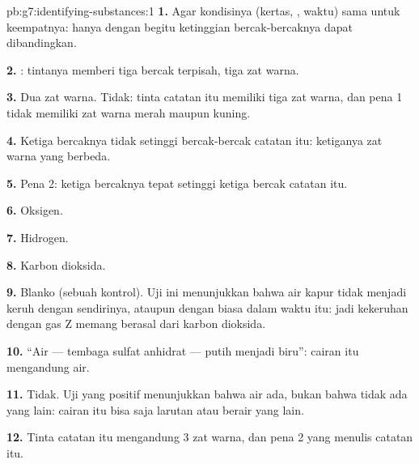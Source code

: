 \begin{solution}{pb:g7:identifying-substances:1}
\textbf{1.} Agar kondisinya (kertas, , waktu) sama untuk
keempatnya: hanya dengan begitu ketinggian bercak-bercaknya dapat
dibandingkan.

\textbf{2.} : tintanya memberi tiga bercak terpisah, tiga zat
warna.

\textbf{3.} Dua zat warna. Tidak: tinta catatan itu memiliki tiga zat
warna, dan pena 1 tidak memiliki zat warna merah maupun kuning.

\textbf{4.} Ketiga bercaknya tidak setinggi bercak-bercak catatan itu:
ketiganya zat warna yang berbeda.

\textbf{5.} Pena 2: ketiga bercaknya tepat setinggi ketiga bercak
catatan itu.

\textbf{6.} Oksigen.

\textbf{7.} Hidrogen.

\textbf{8.} Karbon dioksida.

\textbf{9.} Blanko (sebuah kontrol). Uji ini menunjukkan bahwa air kapur
tidak menjadi keruh dengan sendirinya, ataupun dengan  biasa dalam
waktu itu: jadi kekeruhan dengan gas Z memang berasal dari karbon
dioksida.

\textbf{10.} ``Air --- tembaga sulfat anhidrat --- putih menjadi biru'':
cairan itu mengandung air.

\textbf{11.} Tidak. Uji yang positif menunjukkan bahwa air ada, bukan
bahwa tidak ada yang lain: cairan itu bisa saja larutan atau 
berair yang lain.

\textbf{12.} Tinta catatan itu mengandung 3 zat warna, dan pena 2 yang
menulis catatan itu.
\end{solution}
